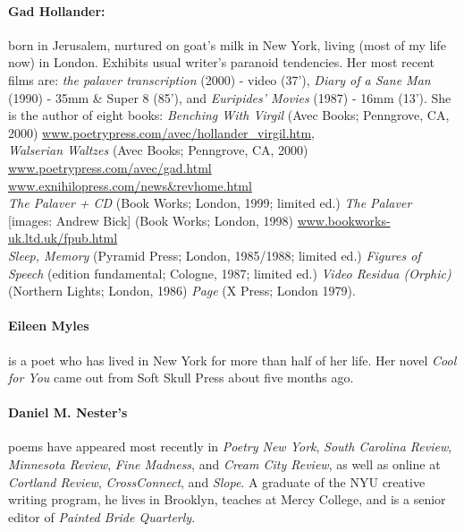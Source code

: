 \documentclass[
]{memoir}
\begin{document}
\hypertarget{gad-hollander}{%
\paragraph{Gad Hollander:}\label{gad-hollander}}

born in Jerusalem, nurtured on goat's milk in New York, living (most of
my life now) in London. Exhibits usual writer's paranoid tendencies. Her
most recent films are: \emph{the palaver transcription} (2000) - video
(37'), \emph{Diary of a Sane Man} (1990) - 35mm \& Super 8 (85'), and
\emph{Euripides' Movies} (1987) - 16mm (13'). She is the author of eight
books: \emph{Benching With Virgil} (Avec Books; Penngrove, CA, 2000)
\href{www.poetrypress.com/\%20avec/hollander_virgil.htm}{www.poetrypress.com/avec/hollander\_virgil.htm},
\emph{\\
Walserian Waltzes} (Avec Books; Penngrove, CA, 2000)
\url{www.poetrypress.com/avec/gad.html}
\href{www.exnihilopress.com/news\&\%20revhome.htm}{www.exnihilopress.com/news\&revhome.html}\\
\emph{The Palaver + CD} (Book Works; London, 1999; limited ed.)
\emph{The Palaver} {[}images: Andrew Bick{]} (Book Works; London, 1998)
\url{www.bookworks-uk.ltd.uk/fpub.html}\\
\emph{Sleep, Memory} (Pyramid Press; London, 1985/1988; limited ed.)
\emph{Figures of Speech} (edition fundamental; Cologne, 1987; limited
ed.) \emph{Video Residua (Orphic)} (Northern Lights; London, 1986)
\emph{Page} (X Press; London 1979).

\hypertarget{eileen-myles}{%
\paragraph{Eileen Myles}\label{eileen-myles}}

is a poet who has lived in New York for more than half of her life. Her
novel \emph{Cool for You} came out from Soft Skull Press about five
months ago.

\hypertarget{daniel-m.-nesters}{%
\paragraph{Daniel M. Nester's}\label{daniel-m.-nesters}}

poems have appeared most recently in \emph{Poetry New York}, \emph{South
Carolina Review}, \emph{Minnesota Review}, \emph{Fine Madness}, and
\emph{Cream City Review}, as well as online at \emph{Cortland Review},
\emph{CrossConnect}, and \emph{Slope}. A graduate of the NYU creative
writing program, he lives in Brooklyn, teaches at Mercy College, and is
a senior editor of \emph{Painted Bride Quarterly}.
\end{document}
